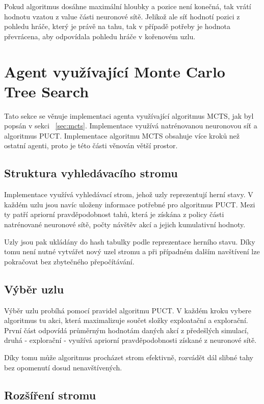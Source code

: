 Pokud algoritmus dosáhne maximální hloubky a pozice není konečná, tak vrátí hodnotu vzatou z value části neuronové sítě. Jelikož ale síť hodnotí pozici
z pohledu hráče, který je právě na tahu, tak v případě potřeby je hodnota převrácena, aby odpovídala pohledu hráče v kořenovém uzlu.

\section{Agent využívající Monte Carlo Tree Search}
\label{sec:MCTS_agent}

Tato sekce se věnuje implementaci agenta využívající algoritmus MCTS, jak byl popsán v sekci ~\ref{sec:mcts}. Implementace využívá natrénovanou 
neuronovou síť a algoritmus PUCT. Implementace algoritmu MCTS obsahuje více kroků než ostatní agenti, proto je této části věnován větší prostor.

\subsection{Struktura vyhledávacího stromu}

Implementace využívá vyhledávací strom, jehož uzly reprezentují herní stavy. V každém uzlu jsou navíc uloženy informace potřebné pro algoritmus PUCT.
Mezi ty patří apriorní pravděpodobnost tahů, která je získána z policy části natrénované neuronové sítě, počty návštěv akcí a jejich kumulativní hodnoty.

Uzly jsou pak ukládány do hash tabulky podle reprezentace herního stavu. Díky tomu není nutné vytvářet nový uzel stromu a při případném dalším
navštívení lze pokračovat bez zbytečného přepočítávání.

\subsection{Výběr uzlu}

Výběr uzlu probíhá pomocí pravidel algoritmu PUCT. V každém kroku vybere algoritmus tu akci, která maximalizuje součet složky exploatační a explorační. 
První část odpovídá průměrným hodnotám daných akcí z předešlých simulací, druhá - explorační - využívá apriorní pravděpodobnosti získané z neuronové sítě.

Díky tomu může algoritmus procházet strom efektivně, rozvádět dál slibné tahy bez opomenutí dosud nenavštívených.

\subsection{Rozšíření stromu}

